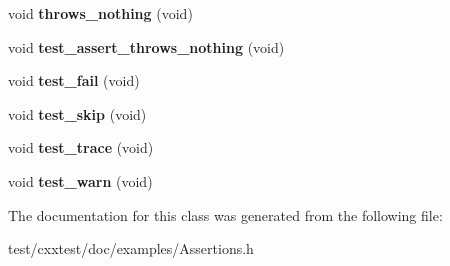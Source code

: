\begin{DoxyCompactItemize}
\item 
\hypertarget{classTest_ac3a0a13139af123650b617bd7844d3ce}{void {\bfseries throws\-\_\-nothing} (void)}\label{classTest_ac3a0a13139af123650b617bd7844d3ce}

\item 
\hypertarget{classTest_a92d2e68379636669c753dcfc145c2cda}{void {\bfseries test\-\_\-assert\-\_\-throws\-\_\-nothing} (void)}\label{classTest_a92d2e68379636669c753dcfc145c2cda}

\item 
\hypertarget{classTest_ab10c077610bb95c4aee0d938426944fe}{void {\bfseries test\-\_\-fail} (void)}\label{classTest_ab10c077610bb95c4aee0d938426944fe}

\item 
\hypertarget{classTest_a45bc2cd00103dbe666261fbe6e8b8ece}{void {\bfseries test\-\_\-skip} (void)}\label{classTest_a45bc2cd00103dbe666261fbe6e8b8ece}

\item 
\hypertarget{classTest_aaf3dc3b9818288dbeb7e31f3ebf091b0}{void {\bfseries test\-\_\-trace} (void)}\label{classTest_aaf3dc3b9818288dbeb7e31f3ebf091b0}

\item 
\hypertarget{classTest_a32aacdf107c952194f895f1e4a0ef93e}{void {\bfseries test\-\_\-warn} (void)}\label{classTest_a32aacdf107c952194f895f1e4a0ef93e}

\end{DoxyCompactItemize}


The documentation for this class was generated from the following file\-:\begin{DoxyCompactItemize}
\item 
test/cxxtest/doc/examples/Assertions.\-h\end{DoxyCompactItemize}
